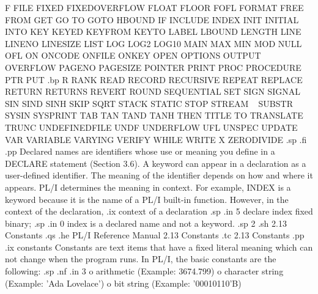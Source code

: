      F              FILE           FIXED             FIXEDOVERFLOW
     FLOAT          FLOOR          FOFL              FORMAT
     FREE           FROM           GET               GO TO             
     GOTO           HBOUND         IF                INCLUDE           
     INDEX          INIT           INITIAL           INTO
     KEY            KEYED          KEYFROM           KEYTO
     LABEL          LBOUND         LENGTH            LINE
     LINENO         LINESIZE       LIST              LOG
     LOG2           LOG10          MAIN              MAX
     MIN            MOD            NULL              OFL
     ON             ONCODE         ONFILE            ONKEY               
     OPEN           OPTIONS        OUTPUT            OVERFLOW            
     PAGENO         PAGESIZE       POINTER           PRINT
     PROC           PROCEDURE      PTR               PUT
.bp
     R              RANK           READ              RECORD
     RECURSIVE      REPEAT         REPLACE           RETURN
     RETURNS        REVERT         ROUND             SEQUENTIAL
     SET            SIGN           SIGNAL            SIN
     SIND           SINH           SKIP              SQRT
     STACK          STATIC         STOP              STREAM
   ~  SUBSTR         SYSIN          SYSPRINT          TAB
     TAN            TAND           TANH              THEN
     TITLE          TO             TRANSLATE         TRUNC
     UNDEFINEDFILE  UNDF           UNDERFLOW         UFL
     UNSPEC         UPDATE         VAR               VARIABLE
     VARYING        VERIFY         WHILE             WRITE
     X              ZERODIVIDE     
.sp 
.fi
.pp
Declared names are identifiers whose use or meaning you define in a DECLARE 
statement (Section 3.6).  A keyword can appear in a declaration as a 
user-defined identifier.  The meaning of the identifier depends on how and 
where it appears.  PL/I determines the meaning in context.  For example, INDEX 
is a keyword because it is the name of a PL/I built-in function.  However, in 
the context of the declaration,
.ix context of a declaration
.sp
.in 5
declare index fixed binary;
.sp
.in 0
index is a declared name and not a keyword.
.sp 2
.sh
2.13  Constants
.qs
.he PL/I Reference Manual                             2.13  Constants
.tc    2.13  Constants
.pp
.ix constants
Constants are text items that have a fixed literal meaning which can not 
change when the program runs.  In PL/I, the basic constants are the following:
.sp
.nf
.in 3 
o arithmetic  (Example: 3674.799)
o character string  (Example: 'Ada Lovelace')
o bit string  (Example: '00010110'B)
